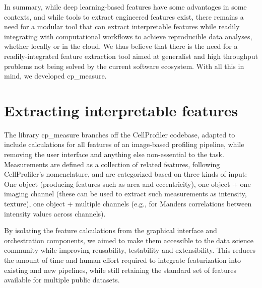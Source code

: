 \documentclass{article}
\begin{document}
In summary, while deep learning-based features have some advantages in some contexts, and while tools to extract engineered features exist, there remains a need for a modular tool that can extract interpretable features while readily integrating with computational workflows to achieve reproducible data analyses, whether locally or in the cloud. We thus believe that there is the need for a readily-integrated feature extraction tool aimed at generalist and high throughput problems not being solved by the current software ecosystem. With all this in mind, we developed cp\_measure.


\section{Extracting interpretable features}
\label{sec:org61842b5}
The library cp\_measure branches off the CellProfiler codebase, adapted to include calculations for all features of an image-based profiling pipeline, while removing the user interface and anything else non-essential to the task. Measurements are defined as a collection of related features, following CellProfiler's nomenclature, and are categorized based on three kinds of input: One object (producing features such as area and eccentricity), one object + one imaging channel (these can be used to extract such measurements as intensity, texture), one object + multiple channels (e.g., for Manders correlations between intensity values across channels).

By isolating the feature calculations from the graphical interface and orchestration components, we aimed to make them accessible to the data science community while improving reusability, testability and extensibility. This reduces the amount of time and human effort required to integrate featurization into existing and new pipelines, while still retaining the standard set of features available for multiple public datasets.

\end{document}
